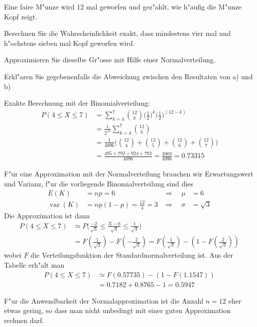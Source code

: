 Eine faire M"unze wird 12 mal geworfen und gez"ahlt, wie h"aufig die
M"unze Kopf zeigt.
\begin{teilaufgaben}
\item Berechnen Sie die Wahrscheinlichkeit exakt, dass mindestens vier mal
und h"ochstens sieben mal Kopf geworfen wird.
\item Approximieren Sie dieselbe Gr"osse mit Hilfe einer Normalverteilung.
\item Erkl"aren Sie gegebenenfalls die Abweichung zwischen den Resultaten
von a) und b)
\end{teilaufgaben}

\begin{loesung}
\begin{teilaufgaben}
\item Exakte Berechnung mit der Binomialverteilung:
\begin{align*}
P(4\le X\le 7)&=\sum_{k=4}^7\binom{12}{k}
\biggl(\frac12\biggr)^k
\biggl(\frac12\biggr)^{(12-k)}
\\
&=\frac1{2^{12}}\sum_{k=4}^{7}\binom{12}{k}
\\
&=\frac1{4096}\biggl(
\binom{12}{4}+
\binom{12}{5}+
\binom{12}{6}+
\binom{12}{7}
\biggr)
\\
&=\frac{495+792+924+792}{4096}
=
\frac{3003}{4096}=0.73315
\end{align*}
\item
F"ur eine Approximation mit der Normalverteilung brauchen wir Erwartungswert
und Varianz, f"ur die vorliegende Binomialverteilung sind dies
\begin{align*}
E(K) &=np=6
&\Rightarrow\quad\mu&=6
\\
\operatorname{var}(K)&=np(1-p)=\frac{12}{4}=3
&\Rightarrow\quad\sigma&=\sqrt{3}
\end{align*}
Die Approximation ist dann
\begin{align*}
P(4\le X\le 7)
&\simeq
P\biggl(
\frac{-2}{\sqrt{3}}\le \frac{X-6}{\sqrt{3}}\le \frac1{\sqrt{3}}
\biggr)
\\
&=F(\frac1{\sqrt{3}})-F(-\frac2{\sqrt{3}})
=F(\frac1{\sqrt{3}})-(1-F(\frac2{\sqrt{3}}))
\end{align*}
wobei $F$ die Verteilungsfunktion der Standardnormalverteilung ist. Aus
der Tabelle erh"alt man
\begin{align*}
P(4\le X\le 7)
&\simeq
F(0.57735) - (1-F(1.1547))
\\
&=0.7182 + 0.8765 - 1=0.5947
\end{align*}
\item
F"ur die Anwendbarkeit der Normalapproximation ist die Anzahl $n=12$
eher etwas gering, so dass man nicht unbedingt mit einer guten Approximation
rechnen darf.


\end{teilaufgaben}
\end{loesung}
